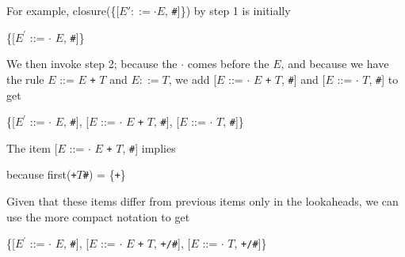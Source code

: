 \documentclass[8pt,a4paper,compress,handout]{beamer}
\newcommand{\mm}[1]{$#1$}
\newcommand{\expo}[2]{$#1^{#2}$}
\newenvironment{spaced}
{
\smallskip
\hspace{.5cm}
\begin{minipage}[c]{\textwidth}
}
{
\end{minipage}
\smallskip
}
\begin{document}
\begin{frame}[fragile]
\pause

For example, closure(\{[$E' ::= \cdot E$, \lstinline{#}]\}) by step 1 is initially

\text{ }
\begin{spaced}
\begin{production}
\{[\expo{E}{\prime} ::= \mm{\cdot} \mm{E}, \lstinline{#}]\}
\end{production}
\end{spaced}

\pause

We then invoke step 2; because the $\cdot$ comes before the $E$, and because we have the rule $E$ ::= $E$ \lstinline{+} $T$ and $E ::= T$, we add [$E$ ::= $\cdot$ $E$ \lstinline{+} $T$, \lstinline{#}] and [$E$ ::= $\cdot$ $T$, \lstinline{#}] to get

\text{ }
\begin{spaced}
\begin{production}
\{[\expo{E}{\prime} ::= \mm{\cdot} \mm{E}, \lstinline{#}],
  [\mm{E}  ::= \mm{\cdot} \mm{E} \lstinline{+} \mm{T}, \lstinline{#}],
  [\mm{E}  ::= \mm{\cdot} \mm{T}, \lstinline{#}]\}
\end{production}
\end{spaced}

\pause

The item [$E$ ::= $\cdot$ $E$ \lstinline{+} $T$, \lstinline{#}] implies

\text{ }
\begin{spaced}
\begin{production}
[\mm{E}  ::= \mm{\cdot} \mm{E} \lstinline{+} \mm{T}, \lstinline{+}]
[\mm{E}  ::= \mm{\cdot} \mm{T}, \lstinline{+}]
\end{production}
\end{spaced}

\pause

\noindent because first(\lstinline{+}$T$\lstinline{#}) = \{\lstinline{+}\}

\pause
\bigskip

Given that these items differ from previous items only in the lookaheads, we can use the more compact notation to get

\text{ }
\begin{spaced}
\begin{production}
\{[\expo{E}{\prime} ::= \mm{\cdot} \mm{E}, \lstinline{#}],
  [\mm{E}  ::= \mm{\cdot} \mm{E} \lstinline{+} \mm{T}, \lstinline{+/#}],
  [\mm{E}  ::= \mm{\cdot} \mm{T}, \lstinline{+/#}]\}
\end{production}
\end{spaced}
\end{frame}
\end{document}
